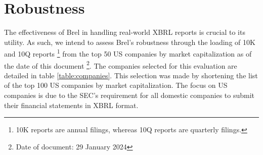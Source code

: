 \section{Robustness}
\label{sec:robustness}


The effectiveness of Brel in handling real-world XBRL reports is crucial to its utility.
As such, we intend to assess Brel's robustness through the loading of 10K and 10Q reports
\footnote{10K reports are annual filings, whereas 10Q reports are quarterly filings.}
from the top 50 US companies by market capitalization as of the date of this document
\footnote{Date of document: 29 January 2024}.
The companies selected for this evaluation are detailed in table \ref{table:companies}.
This selection was made by shortening the list of the top 100 US companies by market capitalization\cite{largest_us_companies}.
The focus on US companies is due to the SEC's requirement for all domestic companies to submit their financial statements in XBRL format\cite{sec_ixbrl}.

